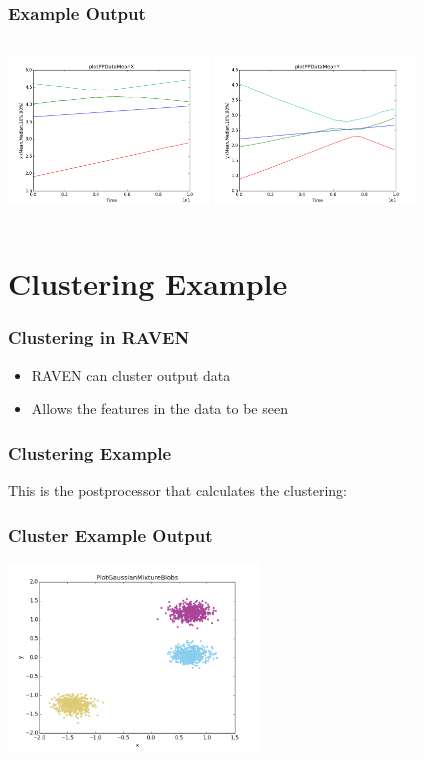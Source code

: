 \documentclass{beamer}
\begin{document}
\begin{frame}
  \frametitle{Example Output}
  \begin{columns}
    \includegraphics[height=4cm]{images/plotPPDataMeanX.png}
    \includegraphics[height=4cm]{images/plotPPDataMeanY.png}
  \end{columns}
\end{frame}

\section{Clustering Example}

\begin{frame}
  \frametitle{Clustering in RAVEN}
  \begin{itemize}
  \item RAVEN can cluster output data
  \item Allows the features in the data to be seen
  \end{itemize}
\end{frame}

\begin{frame}[fragile]
  \frametitle{Clustering Example}
  This is the postprocessor that calculates the clustering:
  

\end{frame}

\begin{frame}
  \frametitle{Cluster Example Output}
  \includegraphics[height=5cm]{images/PlotGaussianMixture.png}
\end{frame}
\end{document}
